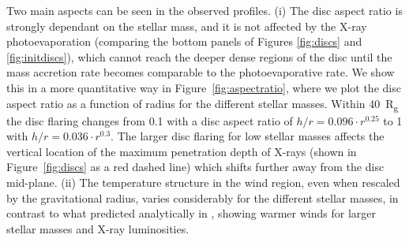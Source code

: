 \documentclass[usenatbib,useAMS,usedcolumn]{mnras}
\begin{document}
Two main aspects can be seen in the observed profiles. 
(i) The disc aspect ratio is strongly dependant on the stellar mass, and it is not affected by the X-ray photoevaporation (comparing the bottom panels of Figures \ref{fig:discs} and \ref{fig:initdiscs}), which cannot reach the deeper dense regions of the disc until the mass accretion rate becomes comparable to the photoevaporative rate. We show this in a more quantitative way in Figure~\ref{fig:aspectratio}, where we plot the disc aspect ratio as a function of radius for the different stellar masses. Within \SI{40}{R_g} the disc flaring changes from \SI{0.1}{\solarmass} with a disc aspect ratio of $h/r = 0.096 \cdot r^{0.25}$ to \SI{1}{\solarmass} with $h/r = 0.036 \cdot r^{0.3}$. The larger disc flaring for low stellar masses affects the vertical location of the maximum penetration depth of X-rays (shown in Figure~\ref{fig:discs} as a red dashed line) which shifts further away from the disc mid-plane.
(ii) The temperature structure in the wind region, even when rescaled by the gravitational radius, varies considerably for the different stellar masses, in contrast to what predicted analytically in , showing warmer winds for larger stellar masses and X-ray luminosities.
\end{document}
